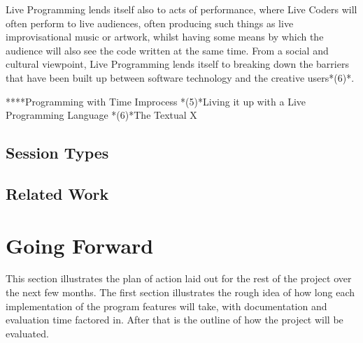 \documentclass[11pt]{scrartcl}
\begin{document}
Live Programming lends itself also to acts of performance, where Live Coders 
will often perform to live audiences, often producing such things as live 
improvisational music or artwork, whilst having some means by which the 
audience will also see the code written at the same time. From a social and 
cultural viewpoint, Live Programming lends itself to breaking down the 
barriers that have been built up between software technology and the creative 
users*(6)*.



****Programming with Time {Improcess}
*(5)*Living it up with a Live Programming Language
*(6)*The Textual X

\subsection{Session Types}



\subsection{Related Work}


\section{Going Forward}
This section illustrates the plan of action laid out for the rest of the 
project over the next few months. The first section illustrates the rough
idea of how long each implementation of the program features will take, 
with documentation and evaluation time factored in. After that is the 
outline of how the project will be evaluated.
\end{document}
